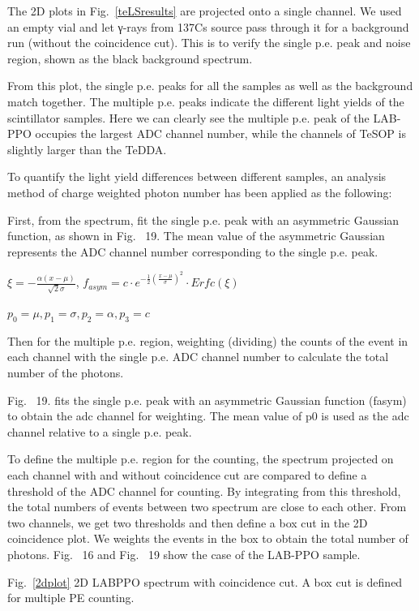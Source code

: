 The 2D plots in Fig.~\ref{teLSresults} are projected onto a single channel. We used an empty vial and let γ-rays from 137Cs source pass through it for a background run (without the coincidence cut). This is to verify the single p.e. peak and noise region, shown as the black background spectrum.

From this plot, the single p.e. peaks for all the samples as well as the background match together. The multiple p.e. peaks indicate the different light yields of the scintillator samples. Here we can clearly see the multiple p.e. peak of the LAB-PPO occupies the largest ADC channel number, while the channels of TeSOP is slightly larger than the TeDDA. 

To quantify the light yield differences between different samples, an analysis method of charge weighted photon number has been applied as the following:

First, from the spectrum, fit the single p.e. peak with an asymmetric Gaussian function, as shown in Fig.~ 19. The mean value of the asymmetric Gaussian represents the ADC channel number corresponding to the single p.e. peak.

$\xi=-\frac{\alpha(x-\mu)}{\sqrt 2\sigma}$,
$f_{asym}=c\cdot e^{-\frac{1}{2}(\frac{x-\mu}{\sigma})^2}\cdot Erfc(\xi)$

$p_0=\mu,p_1=\sigma,p_2=\alpha, p_3=c$ 

Then for the multiple p.e. region, weighting (dividing) the counts of the event in each channel with the single p.e. ADC channel number to calculate the total number of the photons.

Fig.~ 19. fits the single p.e. peak with an asymmetric Gaussian function (fasym) to obtain the adc channel for weighting. The mean value of p0 is used as the adc channel relative to a single p.e. peak.

To define the multiple p.e. region for the counting, the spectrum projected on each channel with and without coincidence cut are compared to define a threshold of the ADC channel for counting. By integrating from this threshold, the total numbers of events between two spectrum are close to each other. From two channels, we get two thresholds and then define a box cut in the 2D coincidence plot. We weights the events in the box to obtain the total number of photons. Fig.~ 16 and Fig.~ 19 show the case of the LAB-PPO sample.

Fig.~\ref{2dplot} 2D LABPPO spectrum with coincidence cut. A box cut is defined for multiple PE counting. 

